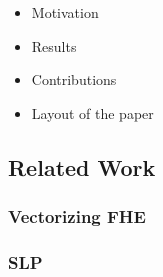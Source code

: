 \begin{itemize}
    \item Motivation
    \item Results
    \item Contributions
    \item Layout of the paper
\end{itemize}
\subsection{Related Work} %
\subsubsection{Vectorizing FHE} 
\subsubsection{SLP} 